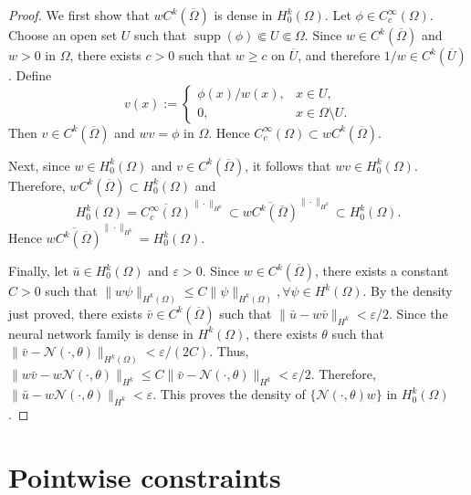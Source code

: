 \documentclass{article}
\numberwithin{equation}{section}
\begin{document}
\begin{proof}
We first show that \(wC^k(\overline{\Omega})\) is dense in \(H_0^k(\Omega)\). Let \(\phi\in C_c^\infty(\Omega)\). Choose an open set \(U\) such that $\operatorname{supp}(\phi)\Subset U\Subset \Omega$. Since $w\in C^k(\overline{\Omega})$ and $w>0$ in \(\Omega\), there exists $c>0$ such that $w\ge c\text{ on } \overline{U}$, and therefore \(1/w\in C^k(\overline{U})\). Define
\[
v(x):=
\begin{cases}
\phi(x)/w(x), & x\in U,\\
0, & x\in \Omega\setminus U.
\end{cases}
\]
Then $v\in C^k(\overline{\Omega})$ and $wv=\phi  \text{ in } \Omega$. Hence $C_c^\infty(\Omega)\subset wC^k(\overline{\Omega})$.

Next, since $w\in H_0^k(\Omega)$ and $v\in C^k(\overline{\Omega})$, it follows that $wv\in H_0^k(\Omega)$. Therefore, $wC^k(\overline{\Omega})\subset H_0^k(\Omega)$ and
\[
H_0^k(\Omega)
=
\overline{C_c^\infty(\Omega)}^{\|\cdot\|_{H^k}}
\subset
\overline{wC^k(\overline{\Omega})}^{\|\cdot\|_{H^k}}
\subset
H_0^k(\Omega).
\]
Hence $\overline{wC^k(\overline{\Omega})}^{\|\cdot\|_{H^k}}
=H_0^k(\Omega)$.


Finally, let \(\bar u\in H_0^k(\Omega)\) and \(\varepsilon>0\). Since $w\in C^k(\overline{\Omega})$, there exists a constant $C>0$ such that $\|w\psi\|_{H^k(\Omega)}\le C\|\psi\|_{H^k(\Omega)},\forall \psi\in H^k(\Omega).$ By the density just proved, there exists \(\bar v\in C^k(\overline{\Omega})\) such that $\|\bar u-w\bar v\|_{H^k}<\varepsilon/2.$ Since the neural network family is dense in \(H^k(\Omega)\), there exists \(\theta\) such that $\|\bar v-\mathcal N(\cdot,\theta)\|_{H^k(\Omega)}
<
\varepsilon/(2C)$. Thus, $
\|w\bar v-w\mathcal N(\cdot,\theta)\|_{H^k}
\le
C\|\bar v-\mathcal N(\cdot,\theta)\|_{H^k}
<\varepsilon/2. $
Therefore, $\|\bar u-w\mathcal N(\cdot,\theta)\|_{H^k}<\varepsilon.$ This proves the density of $\{\mathcal N(\cdot,\theta)w\}$ in $H_0^k(\Omega)$.
\end{proof}



\section{Pointwise constraints}
\label{sec:pointwise}
\end{document}
